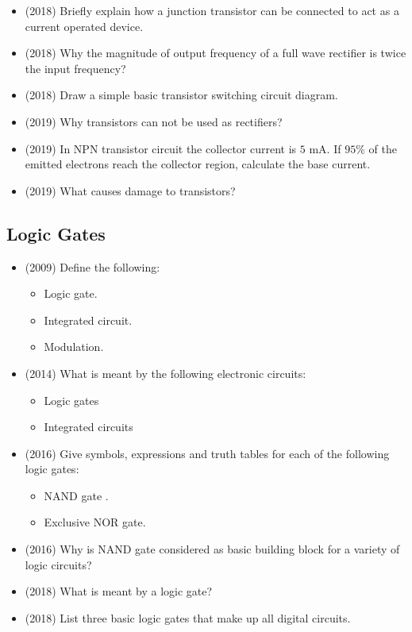 \documentclass{article}
\begin{document}
\begin{itemize}
\item (2018)  Briefly explain how a junction transistor can be connected to act as a current operated device. 
\item (2018)  Why the magnitude of output frequency of a full wave rectifier is twice the input frequency? 
\item (2018)  Draw a simple basic transistor switching circuit diagram. 
\item (2019)  Why transistors can not be used as rectifiers? 
\item (2019)  In NPN transistor circuit the collector current is $ 5$ mA. If $ 95\%$ of the emitted electrons reach the collector region, calculate the base current. 
\item (2019)  What causes damage to transistors? 
\end{itemize}

\subsection{Logic Gates}
\begin{itemize}
\item (2009)  Define the following:
 \begin{itemize}
\item Logic gate.
\item Integrated circuit.
\item Modulation.
\end{itemize}
\item (2014)  What is meant by the following electronic circuits:
 \begin{itemize}
\item Logic gates 
\item Integrated circuits
\end{itemize}
\item (2016)  Give symbols, expressions and truth tables for each of the following logic gates: 
 \begin{itemize}
\item NAND gate .
\item Exclusive NOR gate.
\end{itemize}
\item (2016)  Why is NAND gate considered as basic building block for a variety of logic circuits?
\item (2018)  What is meant by a logic gate? 
\item (2018)  List three basic logic gates that make up all digital circuits. 
\end{itemize}
\end{document}
